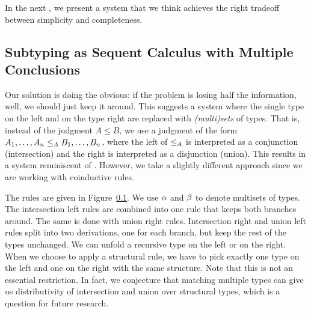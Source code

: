 In the next , we present a system that we think achieves the right tradeoff between simplicity and completeness.


\subsection{Subtyping as Sequent Calculus with Multiple Conclusions}
\label{subtyping-multi}

Our solution is doing the obvious: if the problem is losing half the information, well, we should just keep it around. This suggests a system where the single type on the left and on the type right are replaced with \emph{(multi)sets} of types. That is, instead of the judgment $A \le B$, we use a judgment of the form $A_1, \ldots, A_n \le_A B_1, \ldots, B_n$, where the left of $\le_A$ is interpreted as a conjunction (intersection) and the right is interpreted as a disjunction (union). This results in a system reminiscent of \cite{Gentzen35, Girard87}. However, we take a slightly different approach since we are working with coinductive rules.

The rules are given in Figure~\ref{subtyping-multi}. We use $\alpha$ and $\beta$ to denote multisets of types. The intersection left rules are combined into one rule that keeps both branches around. The same is done with union right rules. Intersection right and union left rules split into two derivations, one for each branch, but keep the rest of the types unchanged. We can unfold a recursive type on the left or on the right. When we choose to apply a structural rule, we have to pick exactly one type on the left and one on the right with the same structure. Note that this is not an essential restriction. In fact, we conjecture that matching multiple types can give us distributivity of intersection and union over structural types, which is a question for future research.

